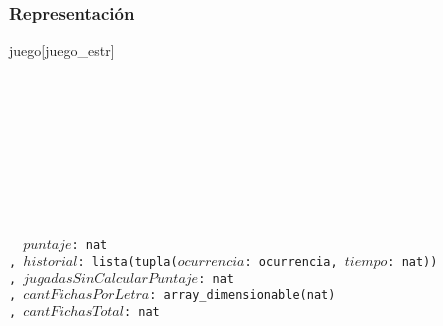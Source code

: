 \subsubsection*{Representación}
\begin{Estructura}{juego}[juego\_estr]
\begin{Tupla}
\begin{adjustwidth}{3em}{}\ \
  \\
  \\
  \\
  \\
\end{adjustwidth}\ \ \ \ \ \ \
\end{Tupla}
\begin{adjustwidth}{3em}{}\
\begin{Tupla}[jugador][y]
    \begin{adjustwidth}{2em}{}\
      \texttt{
        \textrm{$puntaje$:} nat\\
        \textrm{, $historial$:} lista(tupla(\textrm{$ocurrencia$:} ocurrencia\textrm{, $tiempo$:} nat))\\
        \textrm{, $jugadasSinCalcularPuntaje$:} nat\\
        \textrm{, $cantFichasPorLetra$:} array\_dimensionable(nat)\\
        \textrm{, $cantFichasTotal$:} nat
        }
      \end{adjustwidth}
\end{Tupla}
    \end{adjustwidth}
\end{Estructura}


